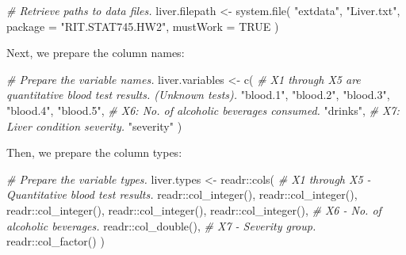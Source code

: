 \documentclass[
  11pt,
  a4paper,
]{scrartcl}
\newenvironment{Shaded}{\begin{snugshade}}{\end{snugshade}}
\newcommand{\AttributeTok}[1]{\textcolor[rgb]{0.77,0.63,0.00}{#1}}
\newcommand{\CommentTok}[1]{\textcolor[rgb]{0.56,0.35,0.01}{\textit{#1}}}
\newcommand{\ConstantTok}[1]{\textcolor[rgb]{0.00,0.00,0.00}{#1}}
\newcommand{\FunctionTok}[1]{\textcolor[rgb]{0.00,0.00,0.00}{#1}}
\newcommand{\NormalTok}[1]{#1}
\newcommand{\OtherTok}[1]{\textcolor[rgb]{0.56,0.35,0.01}{#1}}
\newcommand{\SpecialCharTok}[1]{\textcolor[rgb]{0.00,0.00,0.00}{#1}}
\newcommand{\StringTok}[1]{\textcolor[rgb]{0.31,0.60,0.02}{#1}}
\begin{document}
\begin{Shaded}
\begin{Highlighting}[]
\CommentTok{\# Retrieve paths to data files.}
\NormalTok{liver.filepath }\OtherTok{\textless{}{-}} \FunctionTok{system.file}\NormalTok{(}
  \StringTok{"extdata"}\NormalTok{,}
  \StringTok{"Liver.txt"}\NormalTok{,}
  \AttributeTok{package =} \StringTok{"RIT.STAT745.HW2"}\NormalTok{,}
  \AttributeTok{mustWork =} \ConstantTok{TRUE}
\NormalTok{)}
\end{Highlighting}
\end{Shaded}

Next, we prepare the column names:

\begin{Shaded}
\begin{Highlighting}[]
\CommentTok{\# Prepare the variable names.}
\NormalTok{liver.variables }\OtherTok{\textless{}{-}} \FunctionTok{c}\NormalTok{(}
  \CommentTok{\# X1 through X5 are quantitative blood test results. (Unknown tests).}
  \StringTok{"blood.1"}\NormalTok{,}
  \StringTok{"blood.2"}\NormalTok{,}
  \StringTok{"blood.3"}\NormalTok{,}
  \StringTok{"blood.4"}\NormalTok{,}
  \StringTok{"blood.5"}\NormalTok{,}
  \CommentTok{\# X6: No. of alcoholic beverages consumed.}
  \StringTok{"drinks"}\NormalTok{,}
  \CommentTok{\# X7: Liver condition severity.}
  \StringTok{"severity"}
\NormalTok{)}
\end{Highlighting}
\end{Shaded}

Then, we prepare the column types:

\begin{Shaded}
\begin{Highlighting}[]
\CommentTok{\# Prepare the variable types.}
\NormalTok{liver.types }\OtherTok{\textless{}{-}}\NormalTok{ readr}\SpecialCharTok{::}\FunctionTok{cols}\NormalTok{(}
  \CommentTok{\# X1 through X5 {-} Quantitative blood test results.}
\NormalTok{  readr}\SpecialCharTok{::}\FunctionTok{col\_integer}\NormalTok{(),}
\NormalTok{  readr}\SpecialCharTok{::}\FunctionTok{col\_integer}\NormalTok{(),}
\NormalTok{  readr}\SpecialCharTok{::}\FunctionTok{col\_integer}\NormalTok{(),}
\NormalTok{  readr}\SpecialCharTok{::}\FunctionTok{col\_integer}\NormalTok{(),}
\NormalTok{  readr}\SpecialCharTok{::}\FunctionTok{col\_integer}\NormalTok{(),}
  \CommentTok{\# X6 {-} No. of alcoholic beverages.}
\NormalTok{  readr}\SpecialCharTok{::}\FunctionTok{col\_double}\NormalTok{(),}
  \CommentTok{\# X7 {-} Severity group.}
\NormalTok{  readr}\SpecialCharTok{::}\FunctionTok{col\_factor}\NormalTok{()}
\NormalTok{)}
\end{Highlighting}
\end{Shaded}
\end{document}
